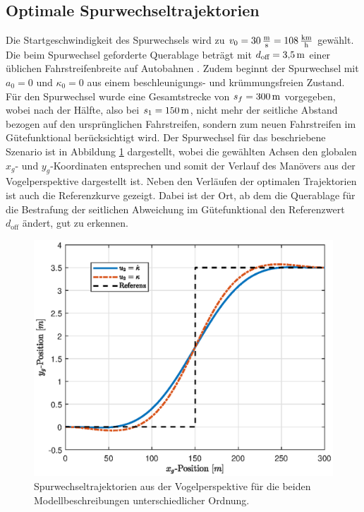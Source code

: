 \subsection{Optimale Spurwechseltrajektorien}\label{subsec:Spurwechseltrajektorien}
Die Startgeschwindigkeit des Spurwechsels wird zu $v_0 = 30\,\mathrm{\frac{\mathrm{m}}{\mathrm{s}}} = 108\,\mathrm{\frac{\mathrm{km}}{\mathrm{h}}}$ gewählt. Die beim Spurwechsel geforderte Querablage beträgt mit $d_{\textrm{off}} = 3{,}5\,\mathrm{m}$ einer üblichen Fahrstreifenbreite auf Autobahnen \cite{ForschungsgesellschaftfurStraenundVerkehrswesen.2008}. Zudem beginnt der Spurwechsel mit $a_0 = 0$ und $\kappa_0 = 0$ aus einem beschleunigungs- und krümmungsfreien Zustand. Für den Spurwechsel wurde eine Gesamtstrecke von $s_f = 300\,\mathrm{m}$ vorgegeben, wobei nach der Hälfte, also bei $s_1 = 150\,\mathrm{m}$, nicht mehr der seitliche Abstand bezogen auf den ursprünglichen Fahrstreifen, sondern zum neuen Fahrstreifen im Gütefunktional berücksichtigt wird. Der Spurwechsel für das beschriebene Szenario ist in Abbildung \ref{fig:xy_pos_s300_v30} dargestellt, wobei die gewählten Achsen den globalen $x_g$- und $y_g$-Koordinaten entsprechen und somit der Verlauf des Manövers aus der Vogelperspektive dargestellt ist. Neben den Verläufen der optimalen Trajektorien ist auch die Referenzkurve gezeigt. Dabei ist der Ort, ab dem die Querablage für die Bestrafung der seitlichen Abweichung im Gütefunktional den Referenzwert $d_{\textrm{off}}$ ändert, gut zu erkennen. 
\begin{figure}[h] 
	\centering
	\includegraphics[width=0.7\linewidth]{./Bilder/Ergebnisse/Geradeausfahrt/Spurwechsel/xy_pos_s300_v30.eps}
	\caption{Spurwechseltrajektorien aus der Vogelperspektive für die beiden Modellbeschreibungen unterschiedlicher Ordnung.}
	\label{fig:xy_pos_s300_v30}
\end{figure} 
